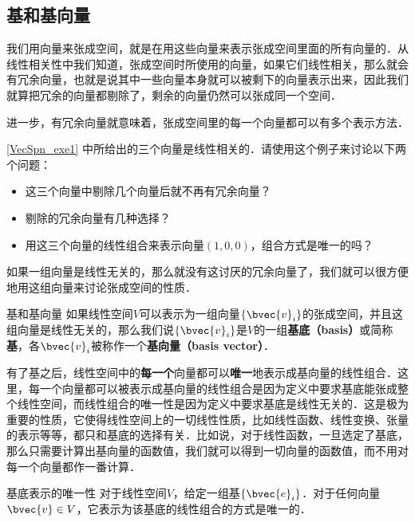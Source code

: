\subsection{基和基向量}

我们用向量来张成空间，就是在用这些向量来表示张成空间里面的所有向量的．从线性相关性中我们知道，张成空间时所使用的向量，如果它们线性相关，那么就会有冗余向量，也就是说其中一些向量本身就可以被剩下的向量表示出来，因此我们就算把冗余的向量都剔除了，剩余的向量仍然可以张成同一个空间．

进一步，有冗余向量就意味着，张成空间里的每一个向量都可以有多个表示方法．

\begin{exercise}{}
\autoref{VecSpn_exe1} 中所给出的三个向量是线性相关的．请使用这个例子来讨论以下两个问题：
\begin{itemize}
\item 这三个向量中剔除几个向量后就不再有冗余向量？
\item 剔除的冗余向量有几种选择？
\item 用这三个向量的线性组合来表示向量$(1,0,0)$，组合方式是唯一的吗？
\end{itemize}
\end{exercise}


如果一组向量是线性无关的，那么就没有这讨厌的冗余向量了，我们就可以很方便地用这组向量来讨论张成空间的性质．

\begin{definition}{基和基向量}
如果线性空间$V$可以表示为一组向量$\{\bvec{v}_i\}$的张成空间，并且这组向量是线性无关的，那么我们说$\{\bvec{v}_i\}$是$V$的一组\textbf{基底（basis）}或简称\textbf{基}，各$\bvec{v}_i$被称作一个\textbf{基向量（basis vector）}．
\end{definition}

有了基之后，线性空间中的\textbf{每一个}向量都可以\textbf{唯一}地表示成基向量的线性组合．这里，每一个向量都可以被表示成基向量的线性组合是因为定义中要求基底能张成整个线性空间，而线性组合的唯一性是因为定义中要求基底是线性无关的．这是极为重要的性质，它使得线性空间上的一切线性性质，比如线性函数、线性变换、张量的表示等等，都只和基底的选择有关．比如说，对于线性函数，一旦选定了基底，那么只需要计算出基向量的函数值，我们就可以得到一切向量的函数值，而不用对每一个向量都作一番计算．

\begin{theorem}{基底表示的唯一性}\label{VecSpn_the1}
对于线性空间$V$，给定一组基$\{\bvec{e}_i\}$．对于任何向量$\bvec{v}\in V$，它表示为该基底的线性组合的方式是唯一的．
\end{theorem}

